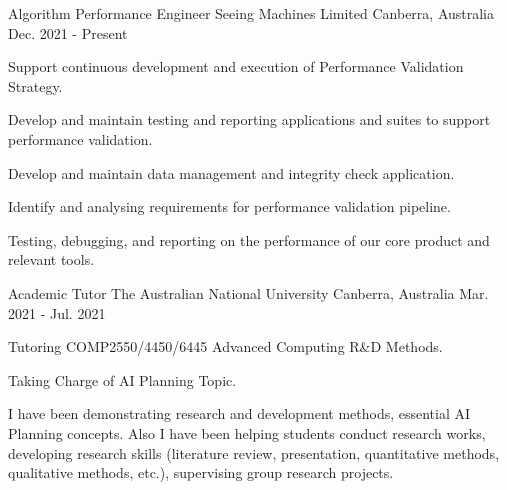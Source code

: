 

\begin{cventries}

  
  \cventry
  {Algorithm Performance Engineer} %
  {Seeing Machines Limited} %
  {Canberra, Australia} %
  {Dec. 2021 - Present} %
  {
  	\begin{cvitems} %
  		\item {Support continuous development and execution of Performance Validation Strategy.}
  		\item {Develop and maintain testing and reporting applications and suites to support performance validation.}
  		\item {Develop and maintain data management and integrity check application.}
  		\item {Identify and analysing requirements for performance validation pipeline.}
  		\item {Testing, debugging, and reporting on the performance of our core product and relevant tools.}  	
  	\end{cvitems}
  }


\cventry
    {Academic Tutor} %
    {The Australian National University} %
    {Canberra, Australia} %
    {Mar. 2021 - Jul. 2021} %
    {
      \begin{cvitems} %
        \item {Tutoring COMP2550/4450/6445 Advanced Computing R\&D Methods.}
        \item {Taking Charge of AI Planning Topic.}
        \item { I have been demonstrating research and development methods, essential AI Planning concepts. Also I have been helping students conduct research works, developing research skills (literature review, presentation, quantitative methods, qualitative methods, etc.), supervising group research projects.}
      \end{cvitems}
    }


\end{cventries}

